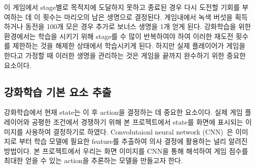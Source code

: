 이 게임에서 stage별로 목적지에 도달하지 못하고 종료된 경우 다시 도전할 기회를 부여하는 데 이 횟수는 마리오의 남은 생명으로 결정된다.
게임내에서 녹색 버섯을 획득하거나 동전을 100개 모은 경우 추가로 보너스 생명을 1개 얻게 된다.
강화학습을 위한 환경에서는 학습을 시키기 위해 stage를 수 많이 반복하여야 하여 이러한 재도전 횟수를 제한하는 것을 해제한 상태에서 학습시키게 된다.
하지만 실제 플레이어가 게임을 한다고 가정할 때 이러한 생명을 관리하는 것은 게임을 끝까지 완수하기 위한 중요한 요소이다.

\subsection{강화학습 기본 요소 추출}
\label{sec:method:basis}
강화학습에서 현재 state는 이 후 action을 결정하는 데 중요한 요소이다.
실제 게임 플레이어와 공평한 조건에서 경쟁하기 위해 본 프로젝트에서 state를 화면에 표시되는 이미지를 사용하여 결정하기로 하였다.
Convolutaionl neural network (CNN)~\cite{CNN}은 이미지로 부터 학습 모델에 필요한 feature를 추출하여 의사 결정에 활용하는 널리 알려진 방법이다.
본 프로젝트에서 우리는 화면 이미지를 CNN을 통해 해석하여 게임 점수를 최대한 얻을 수 있는 action을 추론하는 모델을 만들고자 한다.

